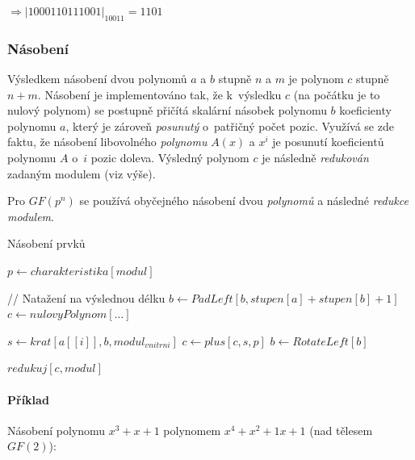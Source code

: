 \documentclass[thesis=M,czech,hidelinks]{FITthesis}[2012/06/26]
\newcommand{\0}{{\textcolor[gray]{0.80}{0}}}
\newenvironment{algoritmus}{
    \floatname{algorithm}{Algoritmus}
    \begin{algorithm}
}{\end{algorithm}}
\begin{document}
$\Rightarrow \left|1000110111001\right|_{10011} = 1101$

\subsubsection{Násobení}

Výsledkem násobení dvou polynomů $a$ a $b$ stupně $n$ a $m$ je polynom $c$
stupně $n+m$. Násobení je implementováno tak, že k~výsledku $c$ (na počátku je
to nulový polynom) se postupně přičítá skalární násobek polynomu $b$ koeficienty
polynomu $a$, který je zároveň \emph{posunutý} o~patřičný počet pozic. Využívá
se zde faktu, že násobení libovolného \emph{polynomu} $A(x)$ a $x^i$ je posunutí
koeficientů polynomu $A$ o~$i$ pozic doleva. Výsledný polynom $c$ je následně
\emph{redukován} zadaným modulem (viz výše).

Pro $GF(p^n)$ se používá obyčejného násobení dvou \emph{polynomů} a následné
\emph{redukce} \emph{modulem}.

\begin{algoritmus}[!ht]
    \caption{Násobení prvků}
    \begin{algorithmic}[1]
        \State $ p \gets charakteristika[ modul ] $

        // Natažení na výslednou délku
        \State $ b \gets PadLeft[ b, stupen[a] + stupen[b] + 1 ] $
        \State $ c \gets nulovyPolynom[\ldots ] $

        \hfil
            \State $ s \gets krat[ a[[i]], b, modul_{vnitrni} ] $
            \State $ c \gets plus[ c, s, p ] $
            \State $ b \gets RotateLeft[b] $
        \EndFor

        \hfil
        \State \Return $redukuj[c,modul]$
     \EndFunction
    \end{algorithmic}
\end{algoritmus}

\paragraph{Příklad} Násobení polynomu $x^3+x+1$ polynomem $x^4+x^2+1x+1$ (nad
tělesem $GF(2)$):
\end{document}
